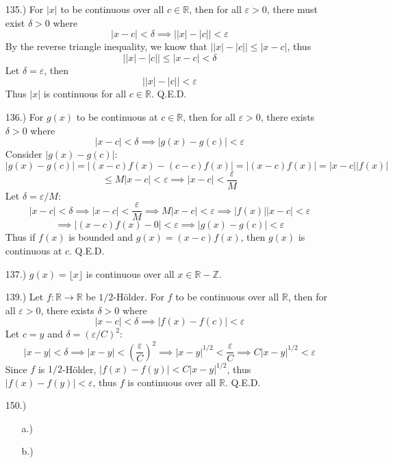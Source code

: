 \documentclass[12pt]{article}
\newcommand{\vertb}[1]{\left\vert#1\right\vert}
\newcommand{\parns}[1]{\left(#1\right)}
\newcommand{\e}{\varepsilon}
\newcommand{\lm}[1]{\displaystyle\lim_{#1}}
\begin{document}
\begin{itemize}



    \item [135.)] For $\vertb{x}$ to be continuous over all $c\in\mathbb{R}$, then for all $\e>0$, there must exist $\delta>0$ where
    \[\vertb{x-c}<\delta\implies\big\vert{\vertb{x}-\vertb{c}}\big\vert<\e\]
    By the reverse triangle inequality, we know that $\big\vert{\vertb{x}-\vertb{c}}\big\vert\leq\vertb{x-c}$, thus
    \[\big\vert{\vertb{x}-\vertb{c}}\big\vert\leq\vertb{x-c}<\delta\]
    Let $\delta=\e$, then
    \[\big\vert{\vertb{x}-\vertb{c}}\big\vert<\e\]
    Thus $\vertb{x}$ is continuous for all $c\in\mathbb{R}$. Q.E.D.

    \item [136.)] For $g(x)$ to be continuous at $c\in\mathbb R$, then for all $\e>0$, there exists $\delta>0$ where
    \[\vertb{x-c}<\delta\implies\vertb{g(x)-g(c)}<\e\]
    Consider $\vertb{g(x)-g(c)}$:
    \[\vertb{g(x)-g(c)}=\vertb{(x-c)f(x)-(c-c)f(x)}=\vertb{(x-c)f(x)}=\vertb{x-c}\vertb{f(x)}\]
    \[\leq M\vertb{x-c}<\e\implies\vertb{x-c}<\frac{\e}{M}\]
    Let $\delta=\e/M$:
    \[\vertb{x-c}<\delta\implies\vertb{x-c}<\frac{\e}{M}\implies M\vertb{x-c}<\e\implies \vertb{f(x)}\vertb{x-c}<\e\]
    \[\implies\vertb{(x-c)f(x)-0}<\e\implies\vertb{g(x)-g(c)}<\e\]
    Thus if $f(x)$ is bounded and $g(x)=(x-c)f(x)$, then $g(x)$ is continuous at $c$. Q.E.D.

    \item [137.)] $g(x)=\lfloor x\rfloor$ is continuous over all $x\in\mathbb{R}-\mathbb{Z}$.
 
    \item [139.)] Let $f:\mathbb R\to\mathbb R$ be $1/2$-H\"older. For $f$ to be continuous over all $\mathbb R$, then for all $\e>0$, there exists $\delta>0$ where
    \[\vertb{x-c}<\delta\implies\vertb{f(x)-f(c)}<\e\]
    Let $c=y$ and $\delta=(\e/C)^2$:
    \[\vertb{x-y}<\delta\implies\vertb{x-y}<\parns{\frac{\e}{C}}^2\implies\vertb{x-y}^{1/2}<\frac{\e}{C}\implies C\vertb{x-y}^{1/2}<\e\]
    Since $f$ is $1/2$-H\"older, $\vertb{f(x)-f(y)}<C\vertb{x-y}^{1/2}$, thus $\vertb{f(x)-f(y)}<\e$, thus $f$ is continuous over all $\mathbb{R}$. Q.E.D.


    \item [150.)] \begin{itemize}
        \item [a.)] 
        
        \item [b.)] 
     \end{itemize}

\end{itemize}
\end{document}
